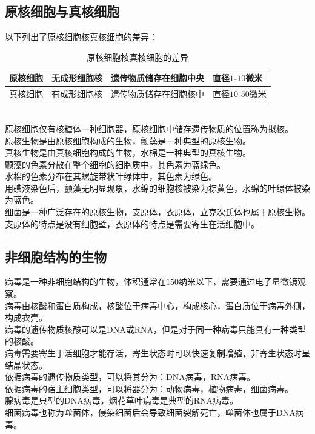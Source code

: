 \documentclass[UTF8]{ctexart}
\begin{document}
\subsection{原核细胞与真核细胞}
    以下列出了原核细胞核真核细胞的差异：\vspace{5pt}
    \begin{table}[h]
        \begin{center}
            \begin{tabular}{l|l|l|l}
                \hline
                原核细胞\qquad&无成形细胞核\qquad&遗传物质储存在细胞中央\qquad&直径$1$-$10$微米\qquad\\ \hline
                真核细胞\qquad&有成形细胞核\qquad&遗传物质储存在细胞核中\qquad&直径$10$-$50$微米\qquad\\ \hline
            \end{tabular}
            \caption{原核细胞核真核细胞的差异}
        \end{center}
    \end{table}\\
    原核细胞仅有核糖体一种细胞器，原核细胞中储存遗传物质的位置称为拟核。\\[3mm]
    原核生物是由原核细胞构成的生物，颤藻是一种典型的原核生物。\\[3mm]
    真核生物是由真核细胞构成的生物，水棉是一种典型的真核生物。\\[6mm]
    颤藻的色素分散在整个细胞的细胞质中，其色素为蓝绿色。\\[3mm]
    水棉的色素分布在其螺旋带状叶绿体中，其色素为绿色。\\[3mm]
    用碘液染色后，颤藻无明显现象，水绵的细胞核被染为棕黄色，水绵的叶绿体被染为蓝色。\\[6mm]
    细菌是一种广泛存在的原核生物，支原体，衣原体，立克次氏体也属于原核生物。\\[3mm]
    支原体的特点是没有细胞壁，衣原体的特点是需要寄生在活细胞中。\\

\subsection{非细胞结构的生物}
    病毒是一种非细胞结构的生物，体积通常在$150$纳米以下，需要通过电子显微镜观察。\\[3mm]
    病毒由核酸和蛋白质构成，核酸位于病毒中心，构成核心，蛋白质位于病毒外侧，构成衣壳。\\[3mm]
    病毒的遗传物质核酸可以是DNA或RNA，但是对于同一种病毒只能具有一种类型的核酸。\\[3mm]
    病毒需要寄生于活细胞才能存活，寄生状态时可以快速复制增殖，非寄生状态时呈结晶状态。\\[6mm]
    依据病毒的遗传物质类型，可以将其分为：DNA病毒，RNA病毒。\\[3mm]
    依据病毒的宿主细胞类型，可以将器分为：动物病毒，植物病毒，细菌病毒。\\[3mm]
    腺病毒是典型的DNA病毒，烟花草叶病毒是典型的RNA病毒。\\[3mm]
    细菌病毒也称为噬菌体，侵染细菌后会导致细菌裂解死亡，噬菌体也属于DNA病毒。
\end{document}
